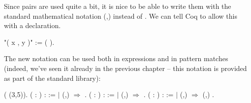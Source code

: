 \documentclass[12pt]{report}
\begin{document}
 Since pairs are used quite a bit, it is nice to be able to
    write them with the standard mathematical notation (,) instead
    of   .  We can tell Coq to allow this with a 
    declaration. \begin{coqdoccode}
\coqdocemptyline
\coqdocnoindent
{} "( x , y )" := (  ).\coqdoceol
\coqdocemptyline
\end{coqdoccode}
The new notation can be used both in expressions and in
    pattern matches (indeed, we've seen it already in the previous
    chapter -- this notation is provided as part of the standard
    library): \begin{coqdoccode}
\coqdocemptyline
\coqdocnoindent
{}   ( (3,5)).\coqdoceol
\coqdocemptyline
\coqdocnoindent
{}  ( : ) :  := \coqdoceol
\coqdocindent{1.00em}
  \coqdoceol
\coqdocindent{1.00em}
\ensuremath{|} (,) \ensuremath{\Rightarrow} \coqdoceol
\coqdocindent{1.00em}
.\coqdoceol
\coqdocnoindent
{}  ( : ) :  := \coqdoceol
\coqdocindent{1.00em}
  \coqdoceol
\coqdocindent{1.00em}
\ensuremath{|} (,) \ensuremath{\Rightarrow} \coqdoceol
\coqdocindent{1.00em}
.\coqdoceol
\coqdocemptyline
\coqdocnoindent
{}  ( : ) :  := \coqdoceol
\coqdocindent{1.00em}
  \coqdoceol
\coqdocindent{1.00em}
\ensuremath{|} (,) \ensuremath{\Rightarrow} (,)\coqdoceol
\coqdocindent{1.00em}
.\coqdoceol
\coqdocemptyline
\end{coqdoccode}
\subsubsection{ }
\end{document}
